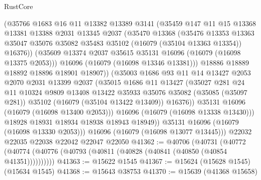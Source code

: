 \begin{lexlean}{RustCore}
\begin{coremodule}
                (@35766
                  @1683
                  @16
                  @11
                  @13382
                  @13389
                  @3141
                  (@35459
                    @147
                    @11
                    @15
                    @13368
                    @13381
                    @13388
                    @2031
                    @13345
                    @2037
                    (@35470
                      @13368
                      (@35476
                        @13353
                        @13363
                        @35047
                        @35076
                        @35082
                        @35483
                        @35102
                        (@16079 (@35104 @13363 @13354))
                        @16376))
                    (@35609 @13374 @2037 @35615 @35131 @16096 (@16079 (@16098 @13375 @2053)))
                    @16096
                    (@16079 (@16098 @13346 @13381)))
                  @18886
                  @18889
                  @18892
                  @18896
                  @18901
                  @18907))
              (@35003
                @1686
                @93
                @11
                @14
                @13427
                @2053
                @2070
                @2031
                @13399
                @2037
                (@35015
                  @1686
                  @11
                  @13427
                  (@35027
                    @281
                    @24
                    @11
                    @10324
                    @9809
                    @13408
                    @13422
                    @35933
                    @35076
                    @35082
                    (@35085 (@35097 @281))
                    @35102
                    (@16079 (@35104 @13422 @13409))
                    @16376))
                @35131
                @16096
                (@16079 (@16098 @13400 @2053)))
              @16096
              (@16079 (@16098 @13338 @13430)))
            @18928
            @18931
            @18934
            @18938
            @18943
            @18949))
        @35131
        @16096
        (@16079 (@16098 @13330 @2053)))
      @16096
      (@16079 (@16098 @13077 @13445)))
    @22032
    @22035
    @22038
    @22042
    @22047
    @22050
@41362 := @40706
    (@40731 (@40772 (@40774 (@40776 (@40793 (@40811 (@40828 (@40841 (@40850 (@40854 @41351))))))))))
@41363 := @15622 @1545
@41367 := @15624 (@15628 @1545) (@15634 @1545)
@41368 := @15643 @38753
@41370 := @15639 (@41368 @15658)

\end{coremodule}
\end{lexlean}

